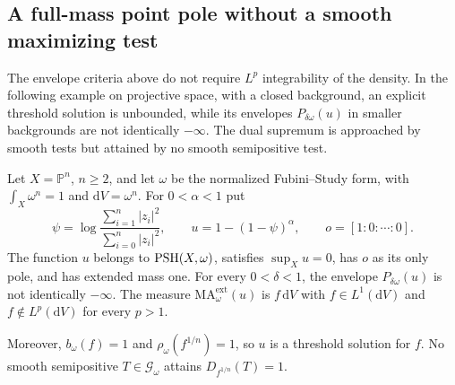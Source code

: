 \subsection{A full-mass point pole without a smooth maximizing test}
\label{subsec:point-pole-dual-nonattainment}

The envelope criteria above do not require $L^p$ integrability of the density. In the following example on projective space, with a closed background, an explicit threshold solution is unbounded, while its envelopes $P_{\delta\omega}(u)$ in smaller backgrounds are not identically $-\infty$. The dual supremum is approached by smooth tests but attained by no smooth semipositive test.

\begin{proposition}\label{prop:point-pole-full-mass-nonattainment}
Let $X=\mathbb P^n$, $n\geq2$, and let $\omega$ be the normalized Fubini--Study form, with $\int_X\omega^n=1$ and $\mathrm{d}V=\omega^n$. For $0<\alpha<1$ put
\[
 \psi=\log\frac{\sum_{i=1}^n|z_i|^2}{\sum_{i=0}^n|z_i|^2},
 \qquad u=1-(1-\psi)^\alpha,
 \qquad o=[1:0:\cdots:0].
\]
The function $u$ belongs to $\mathrm{PSH}(X,\omega)$, satisfies $\sup_Xu=0$, has $o$ as its only pole, and has extended mass one. For every $0<\delta<1$, the envelope $P_{\delta\omega}(u)$ is not identically $-\infty$. The measure $\mathrm{MA}^{\mathrm{ext}}_\omega(u)$ is $f\,\mathrm{d}V$ with $f\in L^1(\mathrm{d}V)$ and $f\notin L^p(\mathrm{d}V)$ for every $p>1$.

Moreover, $b_\omega(f)=1$ and $\rho_\omega(f^{1/n})=1$, so $u$ is a threshold solution for $f$. No smooth semipositive $T\in\mathscr G_\omega$ attains $D_{f^{1/n}}(T)=1$.
\end{proposition}
